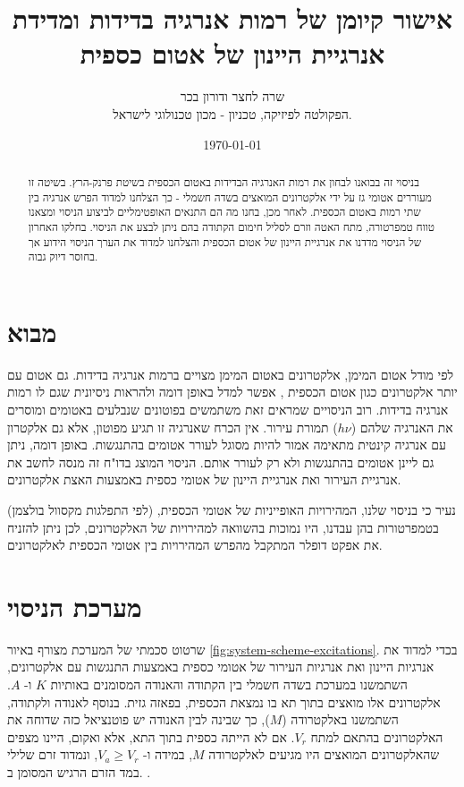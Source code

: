 \documentclass{article}
\title{
אישור קיומן של רמות אנרגיה בדידות ומדידת אנרגיית היינון של אטום כספית
}
\author{
שרה לחצר ודורון בכר \\
הפקולטה לפיזיקה, טכניון - מכון טכנולוגי לישראל.
}
\date{\today}
\newcommand*\circled[1]{\tikz[baseline=(char.base)]{
		            \node[shape=circle,draw,inner sep=1pt] (char) {#1};}}
\begin{document}
\maketitle

\begin{abstract}
בניסוי זה בבואנו לבחון את רמות האנרגיה הבדידות באטום הכספית בשיטת פרנק-הרץ. בשיטה זו מעוררים אטומי גז על ידי אלקטרונים המואצים בשדה חשמלי - כך הצלחנו למדוד הפרש אנרגיה בין שתי רמות באטום הכספית. לאחר מכן, בחנו מה הם התנאים האופטימליים לביצוע הניסוי ומצאנו טווח טמפרטורה, מתח האטה וזרם לסליל חימום הקתודה בהם ניתן לבצע את הניסוי. בחלקו האחרון של הניסוי מדדנו את אנרגיית היינון של אטום הכספית והצלחנו למדוד את הערך הניסוי הידוע אך בחוסר דיוק גבוה.
\end{abstract}

\section{מבוא}

לפי מודל אטום המימן, אלקטרונים באטום המימן מצויים ברמות אנרגיה בדידות. גם אטום
עם יותר אלקטרונים כגון אטום הכספית , אפשר למדל באופן דומה ולהראות
ניסיונית שגם לו רמות אנרגיה בדידות. רוב הניסויים שמראים זאת משתמשים בפוטונים
שנבלעים באטומים ומוסרים את האנרגיה שלהם
($h \nu $)
תמורת עירור. אין הכרח
שאנרגיה זו תגיע מפוטון, אלא גם אלקטרון עם אנרגיה קינטית מתאימה אמור להיות
מסוגל לעורר אטומים בהתנגשות. באופן דומה, ניתן גם ליינן אטומים בהתנגשות ולא רק
לעורר אותם.
הניסוי המוצג בדו"ח זה מנסה לחשב את אנרגיית העירור ואת אנרגיית היינון של אטומי כספית באמצעות האצת אלקטרונים. 

נעיר כי בניסוי שלנו, המהירויות האופייניות של אטומי הכספית, (לפי התפלגות מקסוול בולצמן) בטמפרטורות בהן עבדנו, היו נמוכות בהשוואה למהירויות של האלקטרונים, לכן ניתן להזניח את אפקט דופלר המתקבל מהפרש המהירויות בין אטומי הכספית לאלקטרונים.


\section{מערכת הניסוי}

שרטוט סכמתי של המערכת מצורף באיור
\ref{fig:system-scheme-excitations}.
בכדי למדוד את אנרגיות היינון ואת אנרגיות העירור של אטומי כספית באמצעות התנגשות
עם אלקטרונים, השתמשנו במערכת בשדה חשמלי בין הקתודה והאנודה המסומנים באותיות
$K$
ו-
$A$.
אלקטרונים אלו מואצים בתוך תא בו נמצאת הכספית, בפאזה גזית. בנוסף לאנודה
ולקתודה, השתמשנו באלקטרודה 
($M$),
כך שבינה לבין האנודה יש פוטנציאל כזה שדוחה את
האלקטרונים בהתאם למתח
$V_r$.
אם לא הייתה כספית בתוך התא, אלא ואקום, היינו מצפים
שהאלקטרונים המואצים היו מגיעים לאלקטרודה
$M$,
במידה ו-
$V_a \ge  V_r$,
ונמדוד
זרם שלילי במד הזרם הרגיש המסומן ב.
\circled{pA}.
\end{document}
